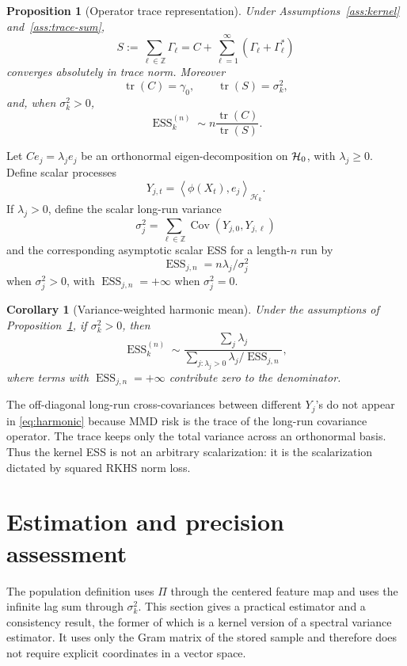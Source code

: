 \documentclass[11pt]{article}
\newtheorem{proposition}[theorem]{Proposition}
\newtheorem{corollary}[theorem]{Corollary}
\newcommand{\1}{\mathbf{1}}
\newcommand{\inner}[2]{\left\langle #1, #2 \right\rangle}
\newcommand{\ESS}{\operatorname{ESS}}
\newcommand{\tr}{\operatorname{tr}}
\newcommand{\Cov}{\operatorname{Cov}}
\newcommand{\Hk}{\mathcal{H}_k}
\begin{document}
\begin{proposition}[Operator trace representation]
\label{prop:operator}
Under Assumptions~\ref{ass:kernel} and~\ref{ass:trace-sum},
\[
S:=\sum_{\ell\in\mathbb Z}\Gamma_\ell
=C+\sum_{\ell=1}^\infty(\Gamma_\ell+\Gamma_\ell^*)
\]
converges absolutely in trace norm. Moreover
\[
\tr(C)=\gamma_0,
\qquad
\tr(S)=\sigma_k^2,
\]
and, when $\sigma_k^2>0$,
\[
\ESS_k^{(n)}\sim n\frac{\tr(C)}{\tr(S)}.
\]
\end{proposition}

Let $C e_j=\lambda_j e_j$ be an orthonormal eigen-decomposition on $\mathcal{H}_0$, with $\lambda_j\ge0$. Define scalar processes
\[
Y_{j,t}=\inner{\phi(X_t)}{e_j}_{\Hk}.
\]
If $\lambda_j>0$, define the scalar long-run variance
\[
\sigma_j^2=\sum_{\ell\in\mathbb Z}\Cov(Y_{j,0},Y_{j,\ell})
\]
and the corresponding asymptotic scalar ESS for a length-$n$ run by
\[
\ESS_{j,n}=n\lambda_j/\sigma_j^2
\]
when $\sigma_j^2>0$, with $\ESS_{j,n}=+\infty$ when $\sigma_j^2=0$.

\begin{corollary}[Variance-weighted harmonic mean]
\label{cor:harmonic}
Under the assumptions of Proposition~\ref{prop:operator}, if $\sigma_k^2>0$, then
\begin{equation}
\label{eq:harmonic}
\ESS_k^{(n)}
\sim
\frac{\sum_j\lambda_j}{\sum_{j:\lambda_j>0}\lambda_j/\ESS_{j,n}},
\end{equation}
where terms with $\ESS_{j,n}=+\infty$ contribute zero to the denominator.
\end{corollary}

The off-diagonal long-run cross-covariances between different $Y_j$'s do not appear in \eqref{eq:harmonic} because MMD risk is the trace of the long-run covariance operator. The trace keeps only the total variance across an orthonormal basis. Thus the kernel ESS is not an arbitrary scalarization: it is the scalarization dictated by squared RKHS norm loss.




\section{Estimation and precision assessment}
\label{sec:estimation}

The population definition uses $\Pi$ through the centered feature map and uses the infinite lag sum through $\sigma_k^2$. This section gives a practical estimator and a consistency result, the former of which is a kernel version of a spectral variance estimator. It uses only the Gram matrix of the stored sample and therefore does not require explicit coordinates in a vector space.
\end{document}
